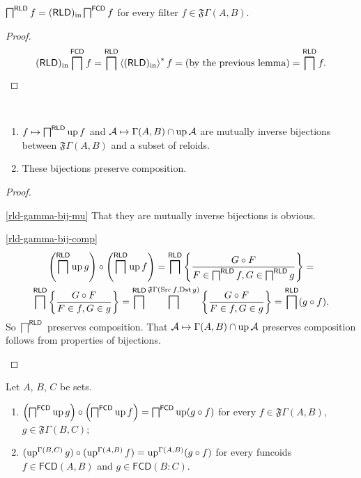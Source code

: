 \begin{lem}
\label{rld-in-fcd-meet}$\bigsqcap^{\mathsf{RLD}} f=(\mathsf{RLD})_{\mathrm{in}}\bigsqcap^{\mathsf{FCD}} f$
for every filter $f\in\mathfrak{F}\Gamma(A,B)$.\end{lem}
\begin{proof}
~
\[
(\mathsf{RLD})_{\mathrm{in}}\bigsqcap^{\mathsf{FCD}} f=\bigsqcap^{\mathsf{RLD}}\left\langle (\mathsf{RLD})_{\mathrm{in}}\right\rangle ^{\ast} f=
\text{(by the previous lemma)}=\bigsqcap^{\mathsf{RLD}} f.
\]
\end{proof}
\begin{lem}
\label{rld-gamma-bij}~
\begin{enumerate}
\item \label{rld-gamma-bij-mu}$f\mapsto\bigsqcap^{\mathsf{RLD}}\operatorname{up} f$
and $\mathcal{A}\mapsto\Gamma(A,B)\cap\operatorname{up}\mathcal{A}$ are mutually
inverse bijections between $\mathfrak{F}\Gamma(A,B)$ and a subset
of reloids.
\item \label{rld-gamma-bij-comp}These bijections preserve composition.
\end{enumerate}
\end{lem}
\begin{proof}
~
\begin{widedisorder}
\item [{\ref{rld-gamma-bij-mu}}] That they are mutually inverse bijections
is obvious.
\item [{\ref{rld-gamma-bij-comp}}] ~
\begin{multline*}
\left(\bigsqcap^{\mathsf{RLD}}\operatorname{up} g\right)\circ\left(\bigsqcap^{\mathsf{RLD}}\operatorname{up} f\right)=\bigsqcap^{\mathsf{RLD}}\left\{ \frac{G\circ F}{F\in\bigsqcap^{\mathsf{RLD}}f,G\in\bigsqcap^{\mathsf{RLD}}g}\right\}=\\
\bigsqcap^{\mathsf{RLD}}\left\{ \frac{G\circ F}{F\in f,G\in g}\right\}=\bigsqcap^{\mathsf{RLD}}\bigsqcap^{\mathfrak{F}\Gamma(\operatorname{Src} f,\operatorname{Dst} g)}\left\{ \frac{G\circ F}{F\in f,G\in g}\right\}=\bigsqcap^{\mathsf{RLD}}(g\circ f).
\end{multline*}
So $\bigsqcap^{\mathsf{RLD}}$ preserves composition. That $\mathcal{A}\mapsto\Gamma(A,B)\cap\operatorname{up}\mathcal{A}$
preserves composition follows from properties of bijections.
\end{widedisorder}
\end{proof}
\begin{lem}
Let $A$, $B$, $C$ be sets.
\begin{enumerate}
\item $\left(\bigsqcap^{\mathsf{FCD}}\operatorname{up} g\right)\circ\left(\bigsqcap^{\mathsf{FCD}}\operatorname{up} f\right)=\bigsqcap^{\mathsf{FCD}}\operatorname{up}(g\circ f)$
for every $f\in\mathfrak{F}\Gamma(A,B)$, $g\in\mathfrak{F}\Gamma(B,C)$;
\item $(\operatorname{up}^{\Gamma(B,C)}g)\circ(\operatorname{up}^{\Gamma(A,B)}f)=\operatorname{up}^{\Gamma(A,B)}(g\circ f)$
for every funcoids $f\in\mathsf{FCD}(A,B)$ and $g\in\mathsf{FCD}(B:C)$.
\end{enumerate}
\end{lem}
